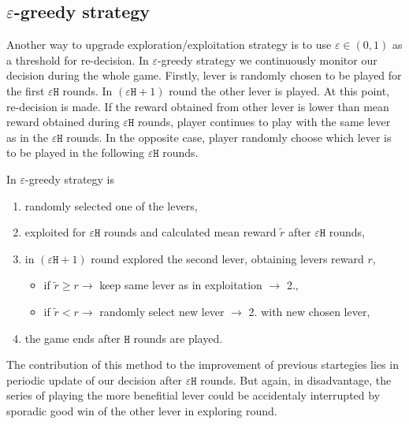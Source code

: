 \documentclass[11pt,american,czech]{article}
\begin{document}
	\subsection*{$\varepsilon$-greedy strategy}
	Another way to upgrade exploration/exploitation strategy is to use $\varepsilon\in(0,1)$ as a threshold for re-decision. In $\varepsilon$-greedy strategy we continuously monitor our decision during the whole game. Firstly, lever is randomly chosen to be played for the first $\varepsilon\mathtt{H}$ rounds. In $(\varepsilon\mathtt{H}+1)$ round the other lever is played. At this point, re-decision is made. If the reward obtained from other lever is lower than mean reward obtained during $\varepsilon\mathtt{H}$ rounds, player continues to play with the same lever as in the $\varepsilon\mathtt{H}$ rounds. In the opposite case, player randomly choose which lever is to be played in the following $\varepsilon\mathtt{H}$ rounds.
	\begin{tcolorbox}[colframe=white]
		In $\varepsilon$-greedy strategy is
		\begin{enumerate}
			\item randomly selected one of the levers,
			\item exploited for $\varepsilon\mathtt{H}$ rounds and calculated mean reward $\tilde{r}$ after $\varepsilon\mathtt{H}$ rounds,
			\item in $(\varepsilon\mathtt{H}+1)$ round explored the second lever, obtaining levers reward $r$,
			\begin{itemize}
				\item if $\tilde{r}\geq r\to$ keep same lever as in exploitation $\to$ 2.,
				\item if $\tilde{r}< r\to$ randomly select new lever $\to$ 2. with new chosen lever,
			\end{itemize}
			\item the game ends after $\mathtt{H}$ rounds are played.
		\end{enumerate}
	\end{tcolorbox}  
	The contribution of this method to the improvement of previous startegies lies in periodic update of our decision after $\varepsilon\mathtt{H}$ rounds. But again, in disadvantage, the series of playing the more benefitial lever could be accidentaly interrupted by sporadic good win of the other lever in exploring round.
\end{document}
